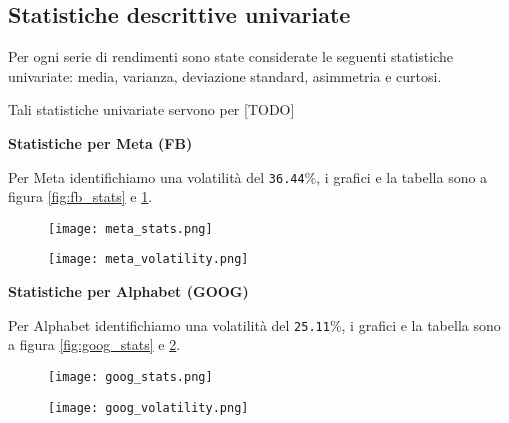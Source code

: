 \pagebreak

\subsection{Statistiche descrittive univariate}

Per ogni serie di rendimenti sono state considerate le seguenti statistiche univariate: media, varianza, deviazione standard, asimmetria e curtosi.

Tali statistiche univariate servono per [TODO]

\textbf{Statistiche per Meta (FB)}

Per Meta identifichiamo una volatilità del \verb|36.44|\%, i grafici e la tabella sono a figura \ref{fig:fb_stats} e \ref{fig:fb_vol}.

\begin{figure}[h]
  \centering
  \begin{minipage}{.5\textwidth}
    \centering
    \vspace{4.35cm}
    \texttt{[image: meta\_stats.png]}
    \label{fig:fb_stats}
  \end{minipage}%
  \begin{minipage}{.5\textwidth}
    \centering
    \texttt{[image: meta\_volatility.png]}
    \label{fig:fb_vol}
  \end{minipage}
\end{figure}

\textbf{Statistiche per Alphabet (GOOG)}

Per Alphabet identifichiamo una volatilità del \verb|25.11|\%, i grafici e la tabella sono a figura \ref{fig:goog_stats} e \ref{fig:goog_vol}.

\begin{figure}[h]
  \centering
  \begin{minipage}{.5\textwidth}
    \centering
    \vspace{4.85cm}
    \texttt{[image: goog\_stats.png]}
    \label{fig:goog_stats}
  \end{minipage}%
  \begin{minipage}{.5\textwidth}
    \centering
    \texttt{[image: goog\_volatility.png]}
    \label{fig:goog_vol}
  \end{minipage}
\end{figure}


